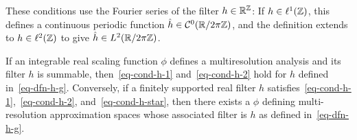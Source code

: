 These conditions use the Fourier series of the filter $h \in \mathbb{R}^{\mathbb{Z}}$:
If $h \in \ell^1(\mathbb{Z})$, this defines a continuous periodic function $\hat h \in \mathcal{C}^0(\mathbb{R}/2\pi\mathbb{Z})$, and the definition extends to $h \in \ell^2(\mathbb{Z})$ to give $\hat h \in L^2(\mathbb{R}/2\pi\mathbb{Z})$.

\begin{thm}\label{thm-multires-approx}
	If an integrable real scaling function $\phi$ defines a multiresolution analysis and its filter $h$ is summable, then~\eqref{eq-cond-h-1} and~\eqref{eq-cond-h-2} hold for $h$ defined in~\eqref{eq-dfn-h-g}.
	Conversely, if a finitely supported real filter $h$ satisfies~\eqref{eq-cond-h-1},~\eqref{eq-cond-h-2}, and~\eqref{eq-cond-h-star}, then there exists a $\phi$ defining multi-resolution approximation spaces whose associated filter is $h$ as defined in~\eqref{eq-dfn-h-g}.
\end{thm}

